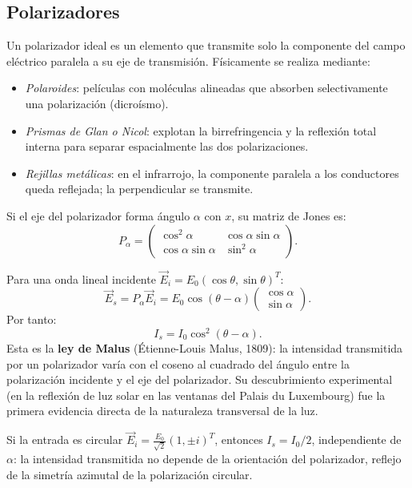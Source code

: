 \documentclass[12pt, a4paper]{article}
\theoremstyle{plain}
\theoremstyle{definition}
\theoremstyle{remark}
\newcommand{\ve}[1]{\vec{#1}}
\begin{document}
\subsection{Polarizadores}

Un polarizador ideal es un elemento que transmite solo la componente del
campo eléctrico paralela a su eje de transmisión. Físicamente se realiza
mediante:
\begin{itemize}
  \item \emph{Polaroides}: películas con moléculas alineadas que absorben
        selectivamente una polarización (dicroísmo).
  \item \emph{Prismas de Glan o Nicol}: explotan la birrefringencia y la
        reflexión total interna para separar espacialmente las dos
        polarizaciones.
  \item \emph{Rejillas metálicas}: en el infrarrojo, la componente paralela
        a los conductores queda reflejada; la perpendicular se transmite.
\end{itemize}

Si el eje del polarizador forma ángulo $\alpha$ con $x$, su matriz de Jones es:
\begin{equation}
  P_\alpha=
  \begin{pmatrix}
    \cos^2\alpha & \cos\alpha\sin\alpha\\
    \cos\alpha\sin\alpha & \sin^2\alpha
  \end{pmatrix}.
  \label{eq:polarizador_jones}
\end{equation}

Para una onda lineal incidente
$\ve{E}_i=E_0(\cos\theta,\sin\theta)^T$:
\[
  \ve{E}_s = P_\alpha \ve{E}_i
  = E_0\cos(\theta-\alpha)
    \begin{pmatrix}\cos\alpha\\ \sin\alpha\end{pmatrix}.
\]
Por tanto:
\begin{equation}
  I_s = I_0\cos^2(\theta-\alpha).
  \label{eq:malus}
\end{equation}
Esta es la \textbf{ley de Malus} (Étienne-Louis Malus, 1809): la intensidad
transmitida por un polarizador varía con el coseno al cuadrado del ángulo
entre la polarización incidente y el eje del polarizador. Su descubrimiento
experimental (en la reflexión de luz solar en las ventanas del Palais du
Luxembourg) fue la primera evidencia directa de la naturaleza transversal de
la luz.

Si la entrada es circular
$\ve{E}_i=\frac{E_0}{\sqrt{2}}(1,\pm i)^T$, entonces
$I_s=I_0/2$, independiente de $\alpha$: la intensidad transmitida no depende
de la orientación del polarizador, reflejo de la simetría azimutal de la
polarización circular.
\end{document}
